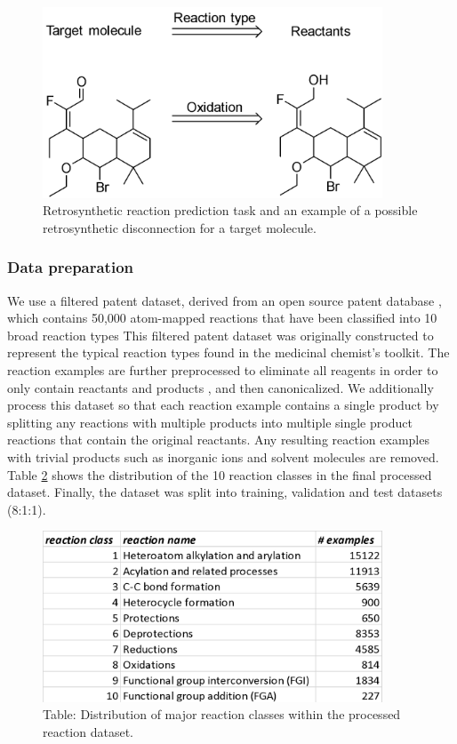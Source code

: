 \begin{figure}
  \centering
  \includegraphics[width=0.9\textwidth]{Images/ret_problem_definition.png}
  \caption{Retrosynthetic reaction prediction task and an example of a possible retrosynthetic disconnection for a target molecule.}
  \label{fig:ret_problem_example}
\end{figure}

\subsubsection{Data preparation}

We use a filtered patent dataset, derived from an open source patent database \cite{lowe2012extraction}, which contains 50,000 atom-mapped reactions that have been classified into 10 broad reaction types \cite{schneider2016s} This filtered patent dataset was originally constructed to represent the typical reaction types found in the medicinal chemist’s toolkit. The reaction examples are further preprocessed to eliminate all reagents in order to only contain reactants and products \cite{schneider2016s}, and then canonicalized. We additionally process this dataset so that each reaction example contains a single product by splitting any reactions with multiple products into multiple single product reactions that contain the original reactants. Any resulting reaction examples with trivial products such as inorganic ions and solvent molecules are removed. Table \ref{fig:ret_table_1} shows the distribution of the 10 reaction classes in the final processed dataset. Finally, the dataset was split into training, validation and test datasets (8:1:1). 

\begin{figure}
  \centering
  \includegraphics[width=0.9\textwidth]{Images/ret_table_1.png}
  \caption{Table: Distribution of major reaction classes within the processed reaction dataset.}
  \label{fig:ret_table_1}
\end{figure}

